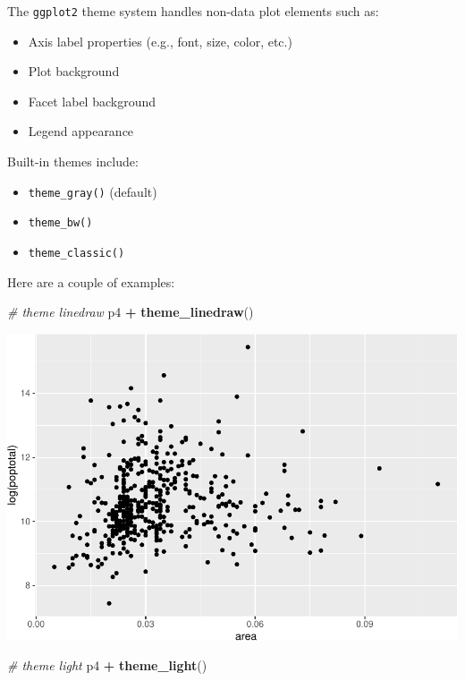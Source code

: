 \documentclass[
]{book}
\newenvironment{Shaded}{\begin{snugshade}}{\end{snugshade}}
\newcommand{\CommentTok}[1]{\textcolor[rgb]{0.56,0.35,0.01}{\textit{#1}}}
\newcommand{\KeywordTok}[1]{\textcolor[rgb]{0.13,0.29,0.53}{\textbf{#1}}}
\newcommand{\NormalTok}[1]{#1}
\newcommand{\OperatorTok}[1]{\textcolor[rgb]{0.81,0.36,0.00}{\textbf{#1}}}
\newcommand{\StringTok}[1]{\textcolor[rgb]{0.31,0.60,0.02}{#1}}
\providecommand{\tightlist}{%
  \setlength{\itemsep}{0pt}\setlength{\parskip}{0pt}}
\begin{document}
The \texttt{ggplot2} theme system handles non-data plot elements such as:

\begin{itemize}
\tightlist
\item
  Axis label properties (e.g., font, size, color, etc.)
\item
  Plot background
\item
  Facet label background
\item
  Legend appearance
\end{itemize}

Built-in themes include:

\begin{itemize}
\tightlist
\item
  \texttt{theme\_gray()} (default)
\item
  \texttt{theme\_bw()}
\item
  \texttt{theme\_classic()}
\end{itemize}

Here are a couple of examples:

\begin{Shaded}
\begin{Highlighting}[]
\CommentTok{\# theme linedraw}
\NormalTok{p4 }\OperatorTok{+}\StringTok{ }\KeywordTok{theme\_linedraw}\NormalTok{()}
\end{Highlighting}
\end{Shaded}

\includegraphics{R/Rgraphics/figures/unnamed-chunk-210-1.pdf}

\begin{Shaded}
\begin{Highlighting}[]
\CommentTok{\# theme light}
\NormalTok{p4 }\OperatorTok{+}\StringTok{ }\KeywordTok{theme\_light}\NormalTok{()}
\end{Highlighting}
\end{Shaded}
\end{document}

